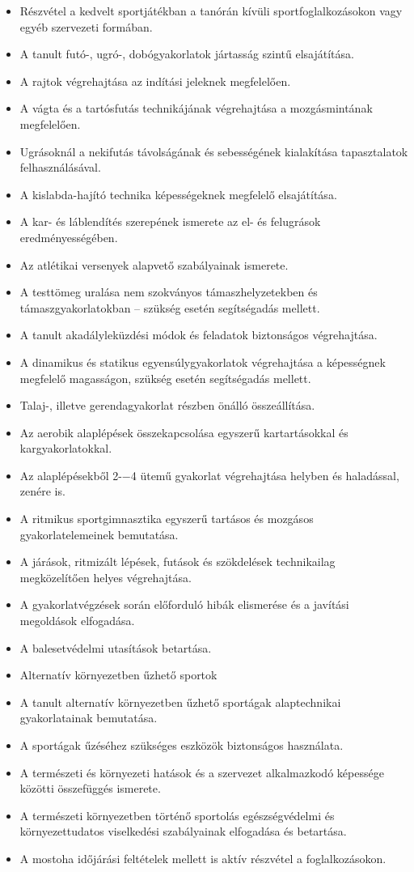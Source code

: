\begin{itemize}
\item Részvétel a kedvelt sportjátékban a tanórán kívüli sportfoglalkozásokon vagy egyéb szervezeti formában.
\item A tanult futó-, ugró-, dobógyakorlatok jártasság szintű elsajátítása.
\item A rajtok végrehajtása az indítási jeleknek megfelelően.
\item A vágta és a tartósfutás technikájának végrehajtása a mozgásmintának megfelelően.
\item Ugrásoknál a nekifutás távolságának és sebességének kialakítása tapasztalatok felhasználásával.
\item A kislabda-hajító technika képességeknek megfelelő elsajátítása.
\item A kar- és láblendítés szerepének ismerete az el- és felugrások eredményességében.
\item Az atlétikai versenyek alapvető szabályainak ismerete.
\item A testtömeg uralása nem szokványos támaszhelyzetekben és támaszgyakorlatokban – szükség esetén segítségadás mellett.
\item A tanult akadályleküzdési módok és feladatok biztonságos végrehajtása.
\item A dinamikus és statikus egyensúlygyakorlatok végrehajtása a képességnek megfelelő magasságon, szükség esetén segítségadás mellett.
\item Talaj-, illetve gerendagyakorlat részben önálló összeállítása.
\item Az aerobik alaplépések összekapcsolása egyszerű kartartásokkal és kargyakorlatokkal.
\item Az alaplépésekből 2-−4 ütemű gyakorlat végrehajtása helyben és haladással, zenére is.
\item A ritmikus sportgimnasztika egyszerű tartásos és mozgásos gyakorlatelemeinek bemutatása.
\item A járások, ritmizált lépések, futások és szökdelések technikailag megközelítően helyes végrehajtása.
\item A gyakorlatvégzések során előforduló hibák elismerése és a javítási megoldások elfogadása.
\item A balesetvédelmi utasítások betartása.
\item Alternatív környezetben űzhető sportok
\item A tanult alternatív környezetben űzhető sportágak alaptechnikai gyakorlatainak bemutatása.
\item A sportágak űzéséhez szükséges eszközök biztonságos használata.
\item A természeti és környezeti hatások és a szervezet alkalmazkodó képessége közötti összefüggés ismerete.
\item A természeti környezetben történő sportolás egészségvédelmi és környezettudatos viselkedési szabályainak elfogadása és betartása.
\item A mostoha időjárási feltételek mellett is aktív részvétel a foglalkozásokon.
\end{itemize}
